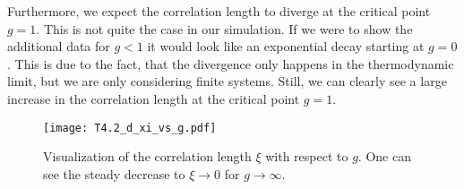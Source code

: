 Furthermore, we expect the correlation length to diverge at the critical point $g=1$.
This is not quite the case in our simulation.
If we were to show the additional data for $g<1$ it would look like an exponential decay starting at $g=0$.
This is due to the fact, that the divergence only happens in the thermodynamic limit, but we are only considering finite systems.
Still, we can clearly see a large increase in the correlation length at the critical point $g=1$.
\begin{figure}[htbp]
    \centering
    \texttt{[image: T4.2\_d\_xi\_vs\_g.pdf]}
    \label{fig:corr_length_vs_g}
    \caption{Visualization of the correlation length $\xi$ with respect to $g$. One can see the steady decrease to $\xi\rightarrow0$ for $g\rightarrow\infty$.}
\end{figure}


